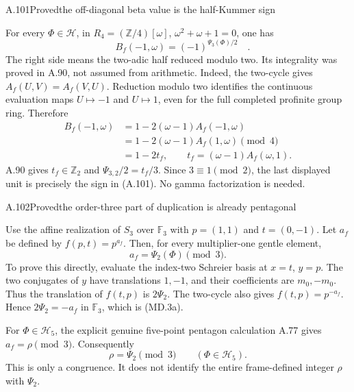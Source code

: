 \begin{statement}{A.101}{Proved}{the off-diagonal beta value is the half-Kummer sign}
\end{statement}
For every $\Phi\in\mathcal H$, in
$R_4=(\mathbb Z/4)[\omega]$, $\omega^2+\omega+1=0$, one has
\[
 \boxed{\quad B_f(-1,\omega)=(-1)^{\Psi_3(\Phi)/2}\quad}.
 \tag{A.101}
\]
The right side means the two-adic half reduced modulo two.
Its integrality was proved in A.90, not assumed from arithmetic.
Indeed, the two-cycle gives $A_f(U,V)=A_f(V,U)$.
Reduction modulo two identifies the continuous evaluation maps
$U\mapsto-1$ and $U\mapsto1$, even for the full completed
profinite group ring. Therefore
\[
\begin{split}
 B_f(-1,\omega)
 &=1-2(\omega-1)A_f(-1,\omega)\\
 &=1-2(\omega-1)A_f(1,\omega)\pmod4\\
 &=1-2t_f,
 \qquad t_f=(\omega-1)A_f(\omega,1).
\end{split}
\]
A.90 gives $t_f\in\mathbb Z_2$ and $\Psi_{3,2}/2=t_f/3$.
Since $3\equiv1\pmod2$, the last displayed unit is precisely
the sign in (A.101). No gamma factorization is needed.

\begin{statement}{A.102}{Proved}{the order-three part of duplication is already pentagonal}
\end{statement}
Use the affine realization of $S_3$ over $\mathbb F_3$ with
$p=(1,1)$ and $t=(0,-1)$. Let $a_f$ be defined by
$f(p,t)=p^{a_f}$. Then, for every multiplier-one gentle element,
\[
 a_f=\Psi_2(\Phi)\pmod3.
 \tag{MD.3a}
\]
To prove this directly, evaluate the index-two Schreier basis at
$x=t$, $y=p$. The two conjugates of $y$ have translations $1,-1$,
and their coefficients are $m_0,-m_0$. Thus the translation of
$f(t,p)$ is $2\Psi_2$. The two-cycle also gives
$f(t,p)=p^{-a_f}$. Hence $2\Psi_2=-a_f$ in $\mathbb F_3$,
which is (MD.3a).

For $\Phi\in\mathcal H_5$, the explicit genuine five-point
pentagon calculation A.77 gives $a_f=\rho\pmod3$. Consequently
\[
 \rho=\Psi_2\pmod3\qquad(\Phi\in\mathcal H_5).
 \tag{MD.3b}
\]
This is only a congruence. It does not identify the entire
frame-defined integer $\rho$ with $\Psi_2$.


